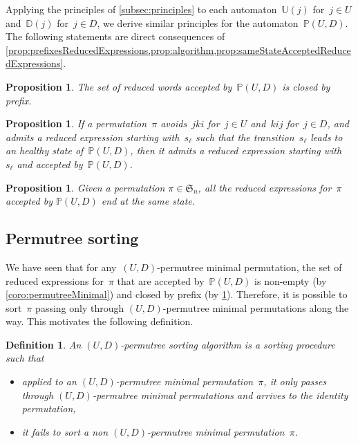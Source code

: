 \documentclass{amsart}
\newtheorem{proposition}[theorem]{Proposition}
\newtheorem{definition}[theorem]{Definition}
\newcommand{\fS}{\mathfrak{S}} %
\newcommand{\defn}[1]{\textsl{\color{darkblue} #1}} %
\newcommand{\automatonP}{\mathbb{P}} %
\newcommand{\automatonU}{\mathbb{U}} %
\newcommand{\automatonD}{\mathbb{D}} %
\begin{document}
Applying the principles of \cref{subsec:principles} to each automaton~$\automatonU(j)$ for~$j \in U$ and~$\automatonD(j)$ for~$j \in D$, we derive similar principles for the automaton~$\automatonP(U,D)$.
The following statements are direct consequences of \cref{prop:prefixesReducedExpressions,prop:algorithm,prop:sameStateAcceptedReducedExpressions}.

\begin{proposition}\label{prop:prefixesReducedExpressionsIntersection}
The set of reduced words accepted by~$\automatonP(U,D)$ is closed by prefix.
\end{proposition}

\begin{proposition}\label{prop:algorithmIntersection}
If a permutation~$\pi$ avoids~$jki$ for~$j \in U$ and~$kij$ for~$j \in D$, and admits a reduced expression starting with~$s_\ell$ such that the transition~$s_\ell$ leads to an healthy state of~$\automatonP(U,D)$, then it admits a reduced expression starting with~$s_\ell$ and accepted by~$\automatonP(U,D)$.
\end{proposition}

\begin{proposition}\label{prop:sameStateAcceptedReducedExpressionsIntersection}
Given a permutation $\pi \in \fS_n$, all the reduced expressions for~$\pi$ accepted by $\automatonP(U,D)$ end at the same state.
\end{proposition}

\subsection{Permutree sorting}\label{subsec:permutreeSorting}

We have seen that for any~$(U,D)$-permutree minimal permutation, the set of reduced expressions for~$\pi$ that are accepted by~$\automatonP(U,D)$ is non-empty (by \cref{coro:permutreeMinimal}) and closed by prefix (by \cref{prop:prefixesReducedExpressionsIntersection}).
Therefore, it is possible to sort~$\pi$ passing only through $(U,D)$-permutree minimal permutations along the way.
This motivates the following definition.

\begin{definition}
An \defn{$(U,D)$-permutree sorting algorithm} is a sorting procedure such that
\begin{itemize}
\item applied to an $(U,D)$-permutree minimal permutation~$\pi$, it only passes through $(U,D)$-permutree minimal permutations and arrives to the identity permutation, 
\item it fails to sort a non $(U,D)$-permutree minimal permutation~$\pi$.
\end{itemize}
\end{definition}
\end{document}
